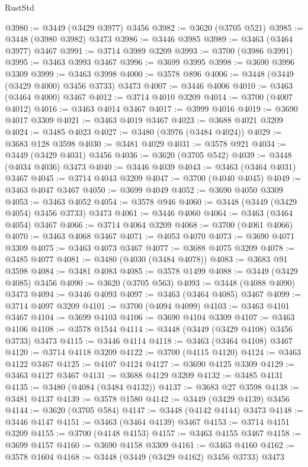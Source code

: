 \begin{lexlean}{RustStd}
\begin{coremodule}
{\begin{coremodule}
{{{{{{{{{{{{{{{{{{{{{{{{{{{{{{{{{{{{{{{{{{{{{{{{{{{{{{{{{{{{{{{{{{{{{{{{{{{{{{{{{{{{{@3980 := @3449 (@3429 @3977) @3456
@3982 := @3620 (@3705 @521)
@3985 := @3448 (@3980 @3982) @3473
@3986 := @3446 @3985
@3989 := @3463 (@3464 @3977) @3467
@3991 := @3714 @3989 @3209
@3993 := @3700 (@3986 @3991)
@3995 := @3463 @3993 @3467
@3996 := @3699 @3995
@3998 := @3690 @3996 @3309
@3999 := @3463 @3998
@4000 := @3578 @896
@4006 := @3448 (@3449 (@3429 @4000) @3456 @3733) @3473
@4007 := @3446 @4006
@4010 := @3463 (@3464 @4000) @3467
@4012 := @3714 @4010 @3209
@4014 := @3700 (@4007 @4012)
@4016 := @3463 @4014 @3467
@4017 := @3999 @4016
@4019 := @3690 @4017 @3309
@4021 := @3463 @4019 @3467
@4023 := @3688 @4021 @3209
@4024 := @3485 @4023
@4027 := @3480 (@3976 (@3484 @4024))
@4029 := @3683 @128 @3598
@4030 := @3481 @4029
@4031 := @3578 @921
@4034 := @3449 (@3429 @4031) @3456
@4036 := @3620 (@3705 @542)
@4039 := @3448 (@4034 @4036) @3473
@4040 := @3446 @4039
@4043 := @3463 (@3464 @4031) @3467
@4045 := @3714 @4043 @3209
@4047 := @3700 (@4040 @4045)
@4049 := @3463 @4047 @3467
@4050 := @3699 @4049
@4052 := @3690 @4050 @3309
@4053 := @3463 @4052
@4054 := @3578 @946
@4060 := @3448 (@3449 (@3429 @4054) @3456 @3733) @3473
@4061 := @3446 @4060
@4064 := @3463 (@3464 @4054) @3467
@4066 := @3714 @4064 @3209
@4068 := @3700 (@4061 @4066)
@4070 := @3463 @4068 @3467
@4071 := @4053 @4070
@4073 := @3690 @4071 @3309
@4075 := @3463 @4073 @3467
@4077 := @3688 @4075 @3209
@4078 := @3485 @4077
@4081 := @3480 (@4030 (@3484 @4078))
@4083 := @3683 @91 @3598
@4084 := @3481 @4083
@4085 := @3578 @1499
@4088 := @3449 (@3429 @4085) @3456
@4090 := @3620 (@3705 @563)
@4093 := @3448 (@4088 @4090) @3473
@4094 := @3446 @4093
@4097 := @3463 (@3464 @4085) @3467
@4099 := @3714 @4097 @3209
@4101 := @3700 (@4094 @4099)
@4103 := @3463 @4101 @3467
@4104 := @3699 @4103
@4106 := @3690 @4104 @3309
@4107 := @3463 @4106
@4108 := @3578 @1544
@4114 := @3448 (@3449 (@3429 @4108) @3456 @3733) @3473
@4115 := @3446 @4114
@4118 := @3463 (@3464 @4108) @3467
@4120 := @3714 @4118 @3209
@4122 := @3700 (@4115 @4120)
@4124 := @3463 @4122 @3467
@4125 := @4107 @4124
@4127 := @3690 @4125 @3309
@4129 := @3463 @4127 @3467
@4131 := @3688 @4129 @3209
@4132 := @3485 @4131
@4135 := @3480 (@4084 (@3484 @4132))
@4137 := @3683 @27 @3598
@4138 := @3481 @4137
@4139 := @3578 @1580
@4142 := @3449 (@3429 @4139) @3456
@4144 := @3620 (@3705 @584)
@4147 := @3448 (@4142 @4144) @3473
@4148 := @3446 @4147
@4151 := @3463 (@3464 @4139) @3467
@4153 := @3714 @4151 @3209
@4155 := @3700 (@4148 @4153)
@4157 := @3463 @4155 @3467
@4158 := @3699 @4157
@4160 := @3690 @4158 @3309
@4161 := @3463 @4160
@4162 := @3578 @1604
@4168 := @3448 (@3449 (@3429 @4162) @3456 @3733) @3473
}}}}}}}}}}}}}}}}}}}}}}}}}}}}}}}}}}}}}}}}}}}}}}}}}}}}}}}}}}}}}}}}}}}}}}}}}}}}}}}}}}}}}
\end{coremodule}}
\end{coremodule}
\end{lexlean}
